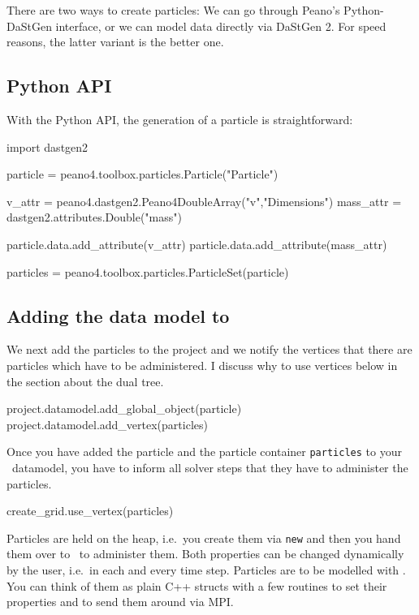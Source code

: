 \noindent
There are two ways to create particles: 
We can go through Peano's Python-DaStGen interface, or we can model data
directly via DaStGen 2.
For speed reasons, the latter variant is the better one.

\subsection{Python API}

With the Python API, the generation of a particle is straightforward:

\begin{code}
import dastgen2


particle = peano4.toolbox.particles.Particle("Particle")

v_attr = peano4.dastgen2.Peano4DoubleArray("v","Dimensions")
mass_attr = dastgen2.attributes.Double("mass")

particle.data.add_attribute(v_attr)
particle.data.add_attribute(mass_attr)

particles = peano4.toolbox.particles.ParticleSet(particle)
\end{code}



\subsection{Adding the data model to \Peano}

We next add the particles to the project and we notify the vertices that there 
are particles which have to be administered. 
I discuss why to use vertices below in the section about the dual tree.

\begin{code}
project.datamodel.add_global_object(particle)
project.datamodel.add_vertex(particles)
\end{code}

\noindent
Once you have added the particle and the particle container \texttt{particles}
to your \Peano\ datamodel, you have to inform all solver steps that they have to
administer the particles.

\begin{code}
create_grid.use_vertex(particles)
\end{code}


\noindent
Particles are held on the heap, i.e.~you create them via \texttt{new} and then
you hand them over to \Peano\ to administer them.
Both properties can be changed dynamically by the user, i.e.~in each and every
time step.
Particles are to be modelled with \DaStGen.
You can think of them as plain C++ structs with a few routines to set their
properties and to send them around via MPI.



